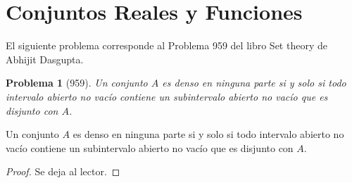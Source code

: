 \documentclass[a4,10pt]{aleph-notas}
\newtheorem*{prob}{Problema}
\begin{document}
\encabezado

\section{Conjuntos Reales y Funciones}

\noindent
El siguiente problema corresponde al Problema 959 del libro Set theory de Abhijit Dasgupta.

\begin{prob}[959]
    Un conjunto $A$ es denso en ninguna parte si y solo si todo intervalo abierto no vacío contiene un subintervalo abierto no vacío que es disjunto con $A$.
\end{prob}

\begin{ejer}[959]
    Un conjunto $A$ es denso en ninguna parte si y solo si todo intervalo abierto no vacío contiene un subintervalo abierto no vacío que es disjunto con $A$.
\end{ejer}

\begin{proof}
    Se deja al lector.
\end{proof}
    
\end{document}
